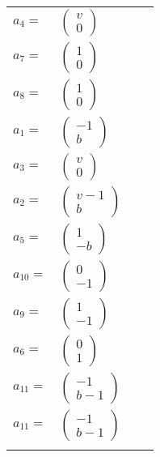 \documentclass[1p]{elsarticle_modified}
\theoremstyle{definition}
\begin{document}
\begin{tabular}{m{7pt} m{180pt} m{7pt} m{180pt} }
\flushright $a_{4}=$&$\begin{pmatrix}v\\0\end{pmatrix}$ \\
\flushright $a_{7}=$&$\begin{pmatrix}1\\0\end{pmatrix}$ \\
\flushright $a_{8}=$&$\begin{pmatrix}1\\0\end{pmatrix}$ \\
\flushright $a_{1}=$&$\begin{pmatrix}-1\\b\end{pmatrix}$ \\
\flushright $a_{3}=$&$\begin{pmatrix}v\\0\end{pmatrix}$ \\
\flushright $a_{2}=$&$\begin{pmatrix}v-1\\b\end{pmatrix}$ \\
\flushright $a_{5}=$&$\begin{pmatrix}1\\- b\end{pmatrix}$ \\
\flushright $a_{10}=$&$\begin{pmatrix}0\\-1\end{pmatrix}$ \\
\flushright $a_{9}=$&$\begin{pmatrix}1\\-1\end{pmatrix}$ \\
\flushright $a_{6}=$&$\begin{pmatrix}0\\1\end{pmatrix}$ \\
\flushright $a_{11}=$&$\begin{pmatrix}-1\\b-1\end{pmatrix}$\\ \flushright $a_{11}=$&$\begin{pmatrix}-1\\b-1\end{pmatrix}$\\&\end{tabular}
\end{document}
